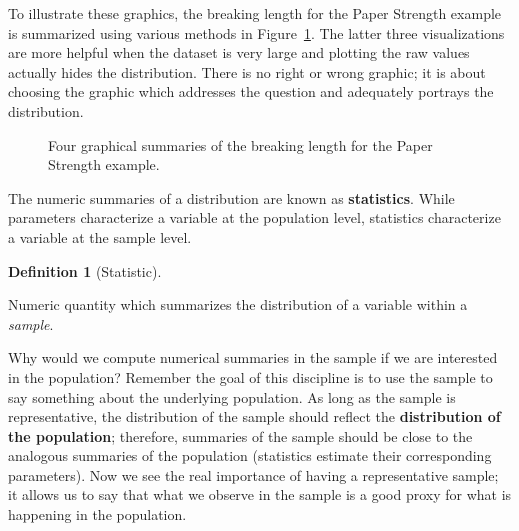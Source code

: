 \documentclass[
  letterpaper,
  DIV=11,
  numbers=noendperiod]{scrreprt}
\theoremstyle{plain}
\theoremstyle{definition}
\theoremstyle{definition}
\newtheorem{definition}{Definition}[chapter]
\theoremstyle{remark}
\begin{document}
To illustrate these graphics, the breaking length for the Paper Strength
example is summarized using various methods in
Figure~\ref{fig-summaries-univariate}. The latter three visualizations
are more helpful when the dataset is very large and plotting the raw
values actually hides the distribution. There is no right or wrong
graphic; it is about choosing the graphic which addresses the question
and adequately portrays the distribution.

\begin{figure}


\caption{\label{fig-summaries-univariate}Four graphical summaries of the
breaking length for the Paper Strength example.}

\end{figure}%

The numeric summaries of a distribution are known as
\textbf{statistics}. While parameters characterize a variable at the
population level, statistics characterize a variable at the sample
level.

\begin{definition}[Statistic]\protect\hypertarget{def-statistic}{}\label{def-statistic}

Numeric quantity which summarizes the distribution of a variable within
a \emph{sample}.

\end{definition}

Why would we compute numerical summaries in the sample if we are
interested in the population? Remember the goal of this discipline is to
use the sample to say something about the underlying population. As long
as the sample is representative, the distribution of the sample should
reflect the \textbf{distribution of the population}; therefore,
summaries of the sample should be close to the analogous summaries of
the population (statistics estimate their corresponding parameters). Now
we see the real importance of having a representative sample; it allows
us to say that what we observe in the sample is a good proxy for what is
happening in the population.
\end{document}
